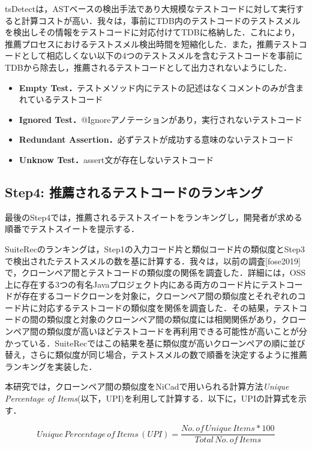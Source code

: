 \documentclass[12pt]{jarticle} %
\begin{document}
{\sf tsDetect}は，ASTベースの検出手法であり大規模なテストコードに対して実行すると計算コストが高い．我々は，事前にTDB内のテストコードのテストスメルを検出しその情報をテストコードに対応付けてTDBに格納した．これにより，推薦プロセスにおけるテストスメル検出時間を短縮化した．また，推薦テストコードとして相応しくない以下の4つのテストスメルを含むテストコードを事前にTDBから除去し，推薦されるテストコードとして出力されないようにした．

\begin{itemize}
\item \textbf{Empty Test．}テストメソッド内にテストの記述はなくコメントのみが含まれているテストコード
\item \textbf{Ignored Test．}@Ignoreアノテーションがあり，実行されないテストコード
\item \textbf{Redundant Assertion．}必ずテストが成功する意味のないテストコード
\item \textbf{Unknow Test．}assert文が存在しないテストコード
\end{itemize}

\subsection{Step4: 推薦されるテストコードのランキング}

最後のStep4では，推薦されるテストスイートをランキングし，開発者が求める順番でテストスイートを提示する．

SuiteRecのランキングは，Step1の入力コード片と類似コード片の類似度とStep3で検出されたテストスメルの数を基に計算する．我々は，以前の調査[fose2019]で，クローンペア間とテストコードの類似度の関係を調査した．詳細には，OSS上に存在する3つの有名Javaプロジェクト内にある両方のコード片にテストコードが存在するコードクローンを対象に，クローンペア間の類似度とそれぞれのコード片に対応するテストコードの類似度を関係を調査した．その結果，テストコードの間の類似度と対象のクローンペア間の類似度には相関関係があり，クローンペア間の類似度が高いほどテストコードを再利用できる可能性が高いことが分かっている．SuiteRecではこの結果を基に類似度が高いクローンペアの順に並び替え，さらに類似度が同じ場合，テストスメルの数で順番を決定するように推薦ランキングを実装した．

本研究では，クローンペア間の類似度をNiCadで用いられる計算方法{\it Unique Percentage of Items}(以下，UPI)を利用して計算する．以下に，UPIの計算式を示す．

\[
  Unique\, Percentage\, of\, Items\, (UPI) =
  \frac{No.\, of\, Unique\, Items * 100}{Total\, No.\, of\, Items}
\]
\end{document}
